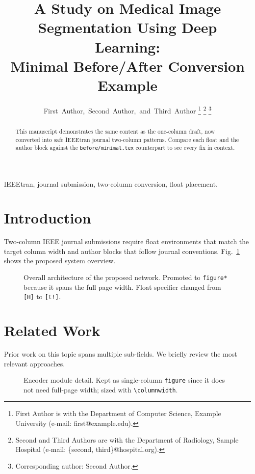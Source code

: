 \documentclass[journal,twocolumn]{IEEEtran}   %
\title{A Study on Medical Image Segmentation Using Deep Learning:\\
Minimal Before/After Conversion Example}
\author{First~Author,~Second~Author,~and~Third~Author%
\thanks{First Author is with the Department of Computer Science,
    Example University (e-mail: first@example.edu).}%
\thanks{Second and Third Authors are with the Department of Radiology,
    Sample Hospital (e-mail: \{second, third\}@hospital.org).}%
\thanks{Corresponding author: Second Author.}}
\begin{document}
\maketitle

\begin{abstract}
This manuscript demonstrates the same content as the one-column draft,
now converted into safe IEEEtran journal two-column patterns.
Compare each float and the author block against the
\texttt{before/minimal.tex} counterpart to see every fix in context.
\end{abstract}

\begin{IEEEkeywords}
IEEEtran, journal submission, two-column conversion, float placement.
\end{IEEEkeywords}

\section{Introduction}
Two-column IEEE journal submissions require float environments that match
the target column width and author blocks that follow journal conventions.
Fig.~\ref{fig:architecture} shows the proposed system overview.
\lipsum[1]

\begin{figure}[t!]
\centering
\fbox{\rule{0pt}{1.8in}\rule{0.92\textwidth}{0pt}}
\caption{Overall architecture of the proposed network.
         Promoted to \texttt{figure*} because it spans the full page width.
         Float specifier changed from \texttt{[H]} to \texttt{[t!]}.}
\label{fig:architecture}
\end{figure}

\section{Related Work}
Prior work on this topic spans multiple sub-fields.
We briefly review the most relevant approaches.
\lipsum[2-3]

\begin{figure}[htbp]
\centering
\fbox{\rule{0pt}{1.4in}\rule{0.92\columnwidth}{0pt}}
\caption{Encoder module detail.
         Kept as single-column \texttt{figure} since it does not need
         full-page width; sized with \texttt{\textbackslash columnwidth}.}
\label{fig:encoder}
\end{figure}
\end{document}
